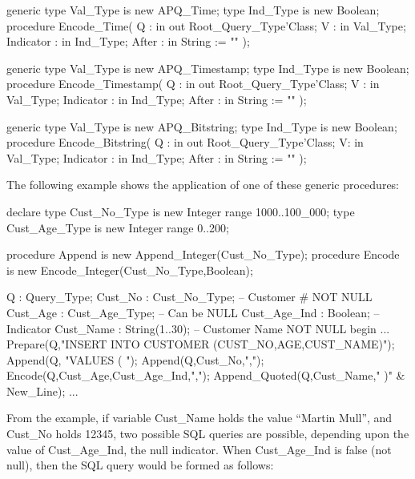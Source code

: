 \documentclass[english,letterpaper]{book}
\begin{document}
\begin{Code}
generic
   type Val_Type is new APQ_Time;
   type Ind_Type is new Boolean;
procedure Encode_Time(
   Q :         in out Root_Query_Type'Class;
   V :         in     Val_Type;
   Indicator : in     Ind_Type;
   After :     in     String := ""
);
\end{Code}

\begin{Code}
generic
   type Val_Type is new APQ_Timestamp;
   type Ind_Type is new Boolean;
procedure Encode_Timestamp(
   Q :         in out Root_Query_Type'Class;
   V :         in     Val_Type;
   Indicator : in     Ind_Type;
   After :     in     String := ""
);
\end{Code}

\begin{Code}
generic
   type Val_Type is new APQ_Bitstring;
   type Ind_Type is new Boolean;
procedure Encode_Bitstring(
   Q :         in out Root_Query_Type'Class;
   V:          in     Val_Type;
   Indicator : in     Ind_Type;
   After :     in     String := ""
);
\end{Code}

The following example shows the application of one of these generic
procedures:

\begin{Example}
declare
   type Cust_No_Type is new Integer range 1000..100_000;
   type Cust_Age_Type is new Integer range 0..200;

   procedure Append is new Append_Integer(Cust_No_Type);
   procedure Encode is new 
      Encode_Integer(Cust_No_Type,Boolean);

   Q :            Query_Type;
   Cust_No :      Cust_No_Type;  -- Customer # NOT NULL
   Cust_Age :     Cust_Age_Type; -- Can be NULL
   Cust_Age_Ind : Boolean;       -- Indicator
   Cust_Name :    String(1..30); -- Customer Name NOT NULL
begin
   ...
   Prepare(Q,"INSERT INTO CUSTOMER (CUST_NO,AGE,CUST_NAME)");
   Append(Q, "VALUES ( ");
   Append(Q,Cust_No,",");
   Encode(Q,Cust_Age,Cust_Age_Ind,",");
   Append_Quoted(Q,Cust_Name," )" & New_Line);
   ...
\end{Example}

From the example, if variable Cust\_Name holds the value ``Martin Mull'',
and Cust\_No holds 12345, two possible SQL queries are possible,
depending upon the value of Cust\_Age\_Ind, the null indicator. When
Cust\_Age\_Ind is false (not null), then the SQL query would be formed as
follows:
\end{document}
